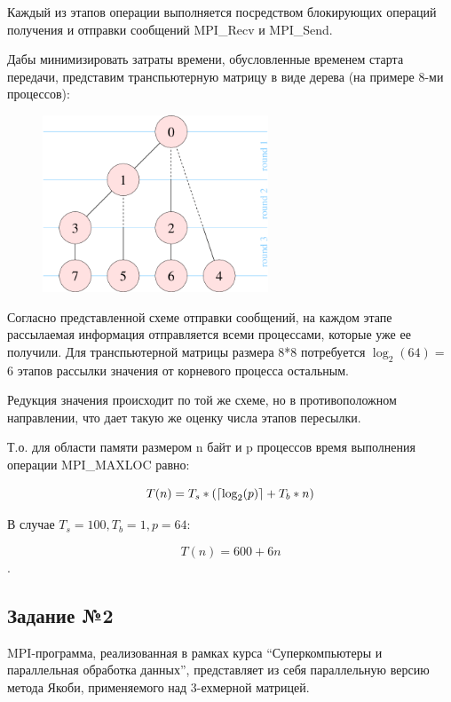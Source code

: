 \documentclass[a4paper]{article}
\DeclarePairedDelimiter\ceil{\lceil}{\rceil}
\begin{document}
Каждый из этапов операции выполняется посредством блокирующих операций получения и отправки сообщений MPI\_Recv и MPI\_Send.

Дабы минимизировать затраты времени, обусловленные временем старта передачи, представим транспьютерную матрицу в виде дерева (на примере 8-ми процессов):

\begin{figure}[htbp]
    \centering
    \includegraphics[width=0.6\textwidth]{pics/tree.png}
\end{figure}

Согласно представленной схеме отправки сообщений, на каждом этапе рассылаемая информация отправляется всеми процессами, которые уже ее получили. Для транспьютерной матрицы размера 8*8 потребуется $\log_2(64) =$ 6 этапов рассылки значения от корневого процесса остальным.

\newpage

Редукция значения происходит по той же схеме, но в противоположном направлении, что дает такую же оценку числа этапов пересылки.

Т.о. для области памяти размером n байт и p процессов время выполнения операции MPI\_MAXLOC равно:

$$ T(n) = T_s * (\ceil*{\log_2(p)} + T_b * n) $$

В случае $T_s = 100, T_b = 1, p = 64$:

$$ T(n) = 600 + 6n $$.

\newpage

\subsection{Задание №2}

MPI-программа, реализованная в рамках курса “Суперкомпьютеры и параллельная обработка данных”, представляет из себя параллельную версию метода Якоби, применяемого над 3-ехмерной матрицей.
\end{document}

